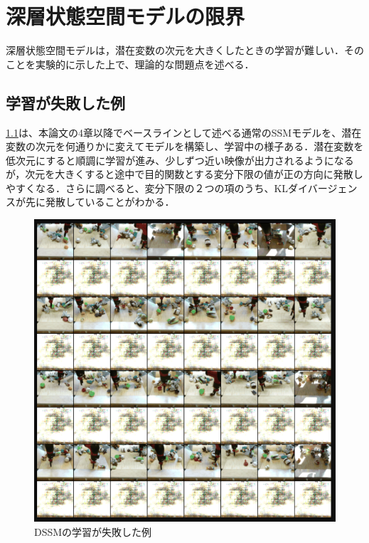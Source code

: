 \chapter{深層状態空間モデルの限界}
\label{chap:baseline}


深層状態空間モデルは，潜在変数の次元を大きくしたときの学習が難しい．そのことを実験的に示した上で、理論的な問題点を述べる．

\section{学習が失敗した例}
\ref{fig:dssm_failure}は、本論文の4章以降でベースラインとして述べる通常のSSMモデルを、潜在変数の次元を何通りかに変えてモデルを構築し、学習中の様子ある．潜在変数を低次元にすると順調に学習が進み、少しずつ近い映像が出力されるようになるが，次元を大きくすると途中で目的関数とする変分下限の値が正の方向に発散しやすくなる．さらに調べると、変分下限の２つの項のうち、KLダイバージェンスが先に発散していることがわかる．


\begin{figure}[tbp]
    \begin{center}
      \includegraphics[width=\linewidth]{./figures/dssm_failure.png}
      \caption{DSSMの学習が失敗した例}
      \label{fig:dssm_failure}
    \end{center}
  \end{figure}


